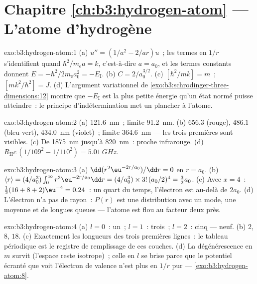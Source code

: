 \section*{Chapitre \ref{ch:b3:hydrogen-atom} --- L'atome d'hydrogène}

\begin{solution}{exo:b3:hydrogen-atom:1}
(a) $u'' = (1/a^2 - 2/ar)u$~; les termes en $1/r$ s'identifient quand
$\hbar^2/m_{\text{e}}a = k$, c'est-à-dire $a = a_0$, et les termes constants
donnent $E = -\hbar^2/2m_{\text{e}}a_0^2 = -E_{\text{I}}$. (b) $C =
2/a_0^{3/2}$. (c) $[\hbar^2/mk] = \unit{m}$~; $[mk^2/\hbar^2] =
\unit{J}$. (d) L'argument variationnel de
\cref{exo:b3:schrodinger-three-dimensions:12} montre que
$-E_{\text{I}}$ est la plus petite énergie qu'un état normé puisse
atteindre~: le principe d'indétermination met un plancher à l'atome.
\end{solution}

\begin{solution}{exo:b3:hydrogen-atom:2}
(a) \qty{121.6}{nm}~; limite \qty{91.2}{nm}. (b) $656.3$ (rouge),
$486.1$ (bleu-vert), \qty{434.0}{nm} (violet)~; limite
\qty{364.6}{nm} --- les trois premières sont visibles. (c) De
\qty{1875}{nm} jusqu'à \qty{820}{nm}~: proche infrarouge. (d)
$R_{\text{H}}c\,(1/109^2 - 1/110^2) = \qty{5.01}{GHz}$.
\end{solution}

\begin{solution}{exo:b3:hydrogen-atom:3}
(a) $\dd(r^2\eu^{-2r/a_0})/\dd r = 0$ en $r = a_0$. (b) $\langle r\rangle = (4/a_0^3)\int_0^\infty
r^3\eu^{-2r/a_0}\dd r = (4/a_0^3)\times 3!\,(a_0/2)^4 = \tfrac32
a_0$. (c) Avec $x = 4$~:
$\tfrac12(16 + 8 + 2)\eu^{-4} = 0.24$~: un quart du temps, l'électron
est au-delà de $2a_0$. (d) L'électron n'a pas de rayon~: $P(r)$ est
une distribution avec un mode, une moyenne et de longues queues ---
l'atome est flou au facteur deux près.
\end{solution}

\begin{solution}{exo:b3:hydrogen-atom:4}
(a) $l = 0$~: un~; $l = 1$~: trois~; $l = 2$~: cinq --- neuf. (b) $2$,
$8$, $18$. (c) Exactement les longueurs des trois premières lignes~:
le tableau périodique est le registre de remplissage de ces couches.
(d) La dégénérescence en $m$ survit (l'espace reste isotrope)~; celle
en $l$ se brise parce que le potentiel écranté que voit l'électron de
valence n'est plus en $1/r$ pur ---
\cref{exo:b3:hydrogen-atom:8}.
\end{solution}

